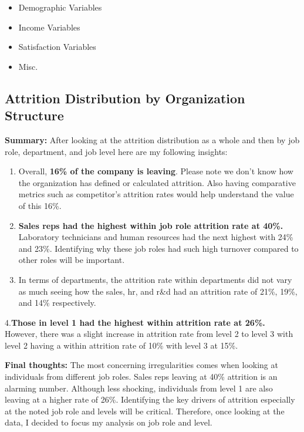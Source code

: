 \documentclass[
]{article}
\providecommand{\tightlist}{%
  \setlength{\itemsep}{0pt}\setlength{\parskip}{0pt}}
\begin{document}
\begin{itemize}
\tightlist
\item
  Demographic Variables
\item
  Income Variables
\item
  Satisfaction Variables
\item
  Misc.
\end{itemize}

\hypertarget{attrition-distribution-by-organization-structure}{%
\subsection{Attrition Distribution by Organization
Structure}\label{attrition-distribution-by-organization-structure}}

\textbf{Summary:} After looking at the attrition distribution as a whole
and then by job role, department, and job level here are my following
insights:

\begin{enumerate}
\def\labelenumi{\arabic{enumi}.}
\item
  Overall, \textbf{16\% of the company is leaving}. Please note we don't
  know how the organization has defined or calculated attrition. Also
  having comparative metrics such as competitor's attrition rates would
  help understand the value of this 16\%.
\item
  \textbf{Sales reps had the highest within job role attrition rate at
  40\%.} Laboratory technicians and human resources had the next highest
  with 24\% and 23\%. Identifying why these job roles had such high
  turnover compared to other roles will be important.
\item
  In terms of departments, the attrition rate within departments did not
  vary as much seeing how the sales, hr, and r\&d had an attrition rate
  of 21\%, 19\%, and 14\% respectively.
\end{enumerate}

4.\textbf{Those in level 1 had the highest within attrition rate at
26\%.} However, there was a slight increase in attrition rate from level
2 to level 3 with level 2 having a within attrition rate of 10\% with
level 3 at 15\%.

\textbf{Final thoughts:} The most concerning irregularities comes when
looking at individuals from different job roles. Sales reps leaving at
40\% attrition is an alarming number. Although less shocking,
individuals from level 1 are also leaving at a higher rate of 26\%.
Identifying the key drivers of attrition especially at the noted job
role and levels will be critical. Therefore, once looking at the data, I
decided to focus my analysis on job role and level.
\end{document}
